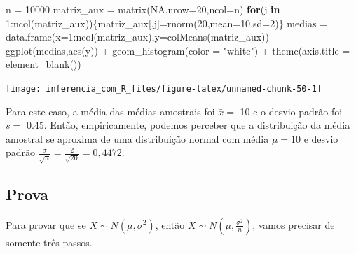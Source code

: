 \documentclass[
]{book}
\newenvironment{Shaded}{\begin{snugshade}}{\end{snugshade}}
\newcommand{\AttributeTok}[1]{\textcolor[rgb]{0.77,0.63,0.00}{#1}}
\newcommand{\ConstantTok}[1]{\textcolor[rgb]{0.00,0.00,0.00}{#1}}
\newcommand{\ControlFlowTok}[1]{\textcolor[rgb]{0.13,0.29,0.53}{\textbf{#1}}}
\newcommand{\DecValTok}[1]{\textcolor[rgb]{0.00,0.00,0.81}{#1}}
\newcommand{\FunctionTok}[1]{\textcolor[rgb]{0.00,0.00,0.00}{#1}}
\newcommand{\NormalTok}[1]{#1}
\newcommand{\OtherTok}[1]{\textcolor[rgb]{0.56,0.35,0.01}{#1}}
\newcommand{\SpecialCharTok}[1]{\textcolor[rgb]{0.00,0.00,0.00}{#1}}
\newcommand{\StringTok}[1]{\textcolor[rgb]{0.31,0.60,0.02}{#1}}
\begin{document}
\begin{Shaded}
\begin{Highlighting}[]
\NormalTok{n }\OtherTok{=} \DecValTok{10000}
\NormalTok{matriz\_aux }\OtherTok{=} \FunctionTok{matrix}\NormalTok{(}\ConstantTok{NA}\NormalTok{,}\AttributeTok{nrow=}\DecValTok{20}\NormalTok{,}\AttributeTok{ncol=}\NormalTok{n)}
\ControlFlowTok{for}\NormalTok{(j }\ControlFlowTok{in} \DecValTok{1}\SpecialCharTok{:}\FunctionTok{ncol}\NormalTok{(matriz\_aux))\{matriz\_aux[,j]}\OtherTok{=}\FunctionTok{rnorm}\NormalTok{(}\DecValTok{20}\NormalTok{,}\AttributeTok{mean=}\DecValTok{10}\NormalTok{,}\AttributeTok{sd=}\DecValTok{2}\NormalTok{)\}}
\NormalTok{medias }\OtherTok{=} \FunctionTok{data.frame}\NormalTok{(}\AttributeTok{x=}\DecValTok{1}\SpecialCharTok{:}\FunctionTok{ncol}\NormalTok{(matriz\_aux),}\AttributeTok{y=}\FunctionTok{colMeans}\NormalTok{(matriz\_aux))}
\FunctionTok{ggplot}\NormalTok{(medias,}\FunctionTok{aes}\NormalTok{(y)) }\SpecialCharTok{+}
  \FunctionTok{geom\_histogram}\NormalTok{(}\AttributeTok{color =} \StringTok{"white"}\NormalTok{) }\SpecialCharTok{+}
  \FunctionTok{theme}\NormalTok{(}\AttributeTok{axis.title =} \FunctionTok{element\_blank}\NormalTok{())}
\end{Highlighting}
\end{Shaded}

\begin{center}\texttt{[image: inferencia\_com\_R\_files/figure-latex/unnamed-chunk-50-1]} \end{center}

Para este caso, a média das médias amostrais foi \(\bar x=\) 10 e o desvio padrão foi \(s =\) 0.45. Então, empiricamente, podemos perceber que a distribuição da média amostral se aproxima de uma distribuição normal com média \(\mu=10\) e desvio padrão \(\frac{\sigma}{\sqrt{n}}=\frac{2}{\sqrt{20}}=0,4472\).

\hypertarget{prova}{%
\subsection{Prova}\label{prova}}

Para provar que se \(X\sim N(\mu,\sigma^2)\), então \(\bar X \sim N(\mu,\frac{\sigma^2}{n})\), vamos precisar de somente três passos.
\end{document}
